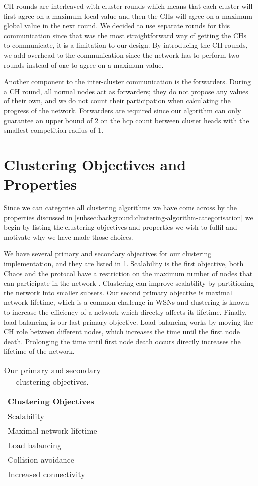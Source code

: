 CH rounds are interleaved with cluster rounds which means that each cluster will first agree on a maximum local value and then the CHs will agree on a maximum global value in the next round. We decided to use separate rounds for this communication since that was the most straightforward way of getting the CHs to communicate, it is a limitation to our design. By introducing the CH rounds, we add overhead to the communication since the network has to perform two rounds instead of one to agree on a maximum value.

Another component to the inter-cluster communication is the forwarders. During a CH round, all normal nodes act as forwarders; they do not propose any values of their own, and we do not count their participation when calculating the progress of the network. Forwarders are required since our algorithm can only guarantee an upper bound of 2 on the hop count between cluster heads with the smallest competition radius of 1.


\section{Clustering Objectives and Properties}
Since we can categorise all clustering algorithms we have come across by the properties discussed in \cref{subsec:background:clustering-algorithm-categorisation} we begin by listing the clustering objectives and properties we wish to fulfil and motivate why we have made those choices.


We have several primary and secondary objectives for our clustering implementation, and they are listed in \cref{fig:primary-and-secondary-objectives}. Scalability is the first objective, both Chaos and the \atwo{} protocol have a restriction on the maximum number of nodes that can participate in the network \cite{chaos-introduction-paper}. Clustering can improve scalability by partitioning the network into smaller subsets. Our second primary objective is maximal network lifetime, which is a common challenge in WSNs \cite{Afsar2014-clustering-survey, NikolaosA.Pantaziz2007-wsn-power-survey} and clustering is known to increase the efficiency of a network which directly affects its lifetime. Finally, load balancing is our last primary objective. Load balancing works by moving the CH role between different nodes, which increases the time until the first node death. Prolonging the time until first node death occurs directly increases the lifetime of the network.

\begin{table}[bt]
    \centering
    \caption{Our primary and secondary clustering objectives.}
    \begin{tabular}{l}
        \textbf{Clustering Objectives}    \\ \hline
        Scalability              \\
        Maximal network lifetime \\
        Load balancing           \\
        Collision avoidance      \\
        Increased connectivity  
    \end{tabular}
    \label{fig:primary-and-secondary-objectives}
\end{table}

